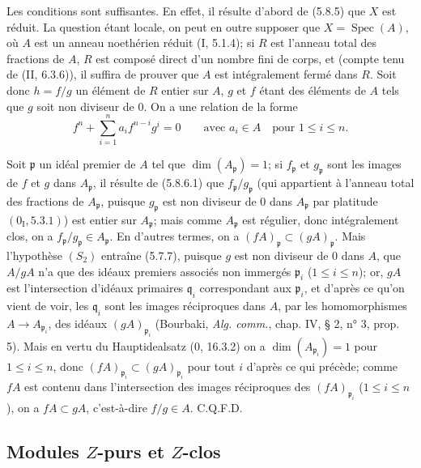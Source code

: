 Les conditions sont suffisantes. En effet, il résulte d'abord de (5.8.5) que
$X$ est réduit. La question étant locale, on peut en outre supposer que
$X=\operatorname{Spec}(A)$, où $A$ est un anneau noethérien réduit
(I, 5.1.4); si $R$ est l'anneau total des fractions de $A$, $R$ est composé
direct d'un nombre fini de corps, et (compte tenu de (II, 6.3.6)), il suffira
de prouver que $A$ est intégralement fermé dans $R$. Soit donc $h=f/g$ un
élément de $R$ entier sur $A$, $g$ et $f$ étant des éléments de $A$ tels que
$g$ soit non diviseur de 0. On a une relation de la forme
\begin{equation}
f^n+\sum_{i=1}^n a_i f^{n-i}g^i=0
\qquad\text{avec }a_i\in A\quad\text{pour }1\leq i\leq n.
\tag{5.8.6.1}\label{IV.2.s5.8.6.1-fr}
\end{equation}

Soit $\mathfrak p$ un idéal premier de $A$ tel que
$\dim(A_{\mathfrak p})=1$; si $f_{\mathfrak p}$ et $g_{\mathfrak p}$ sont
les images de $f$ et $g$ dans $A_{\mathfrak p}$, il résulte de (5.8.6.1) que
$f_{\mathfrak p}/g_{\mathfrak p}$ (qui appartient à l'anneau total des
fractions de $A_{\mathfrak p}$, puisque $g_{\mathfrak p}$ est non diviseur
de 0 dans $A_{\mathfrak p}$ par platitude $(0_{\mathrm I},5.3.1)$) est entier
sur $A_{\mathfrak p}$; mais comme $A_{\mathfrak p}$ est régulier, donc
intégralement clos, on a $f_{\mathfrak p}/g_{\mathfrak p}\in A_{\mathfrak p}$.
En d'autres termes, on a
$(fA)_{\mathfrak p}\subset(gA)_{\mathfrak p}$. Mais l'hypothèse $(S_2)$
entraîne (5.7.7), puisque $g$ est non diviseur de 0 dans $A$, que $A/gA$
n'a que des idéaux premiers associés non immergés $\mathfrak p_i$
($1\leq i\leq n$); or, $gA$ est l'intersection d'idéaux primaires
$\mathfrak q_i$ correspondant aux $\mathfrak p_i$, et d'après ce qu'on vient
de voir, les $\mathfrak q_i$ sont les images réciproques dans $A$, par les
homomorphismes $A\to A_{\mathfrak p_i}$, des idéaux
$(gA)_{\mathfrak p_i}$ (Bourbaki, \emph{Alg. comm.}, chap. IV, § 2, n° 3,
prop. 5). Mais en vertu du Hauptidealsatz (0, 16.3.2) on a
$\dim(A_{\mathfrak p_i})=1$ pour $1\leq i\leq n$, donc
$(fA)_{\mathfrak p_i}\subset(gA)_{\mathfrak p_i}$ pour tout $i$ d'après ce
qui précède; comme $fA$ est contenu dans l'intersection des images
réciproques des $(fA)_{\mathfrak p_i}$ ($1\leq i\leq n$), on a
$fA\subset gA$, c'est-à-dire $f/g\in A$. C.Q.F.D.


\subsection{Modules $Z$-purs et $Z$-clos}

